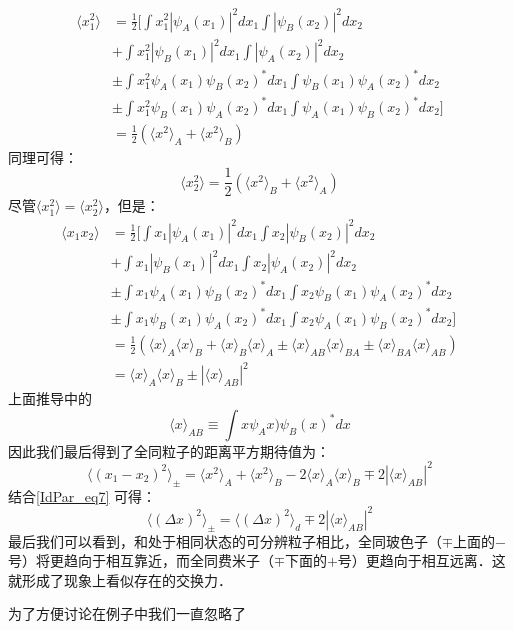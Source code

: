 \begin{itemize}
\begin{align}
\langle x_1^2\rangle &= \frac{1}{2}\big[\int x_1^2|\psi_A(x_1)|^2dx_1\int |\psi_B(x_2)|^2dx_2\\
&+\int x_1^2|\psi_B(x_1)|^2dx_1\int |\psi_A(x_2)|^2dx_2\\ 
&\pm\int x_1^2\psi_A(x_1)\psi_B(x_2)^*dx_1\int \psi_B(x_1)\psi_A(x_2)^*dx_2\\
&\pm\int x_1^2\psi_B(x_1)\psi_A(x_2)^*dx_1\int \psi_A(x_1)\psi_B(x_2)^*dx_2\big]\\
&=\frac{1}{2}(\langle x^2\rangle_A+\langle x^2\rangle_B)
\end{align}
同理可得：
\begin{equation}
\langle x_2^2\rangle=\frac{1}{2}(\langle x^2\rangle_B+\langle x^2\rangle_A)
\end{equation}
尽管$\langle x_1^2\rangle=\langle x_2^2\rangle$，但是：
\begin{align}
\langle x_1x_2\rangle &= \frac{1}{2}\big[\int x_1|\psi_A(x_1)|^2dx_1\int x_2 |\psi_B(x_2)|^2dx_2\\
&+\int x_1|\psi_B(x_1)|^2dx_1\int x_2|\psi_A(x_2)|^2dx_2\\ 
&\pm\int x_1\psi_A(x_1)\psi_B(x_2)^*dx_1\int x_2\psi_B(x_1)\psi_A(x_2)^*dx_2\\
&\pm\int x_1\psi_B(x_1)\psi_A(x_2)^*dx_1\int x_2\psi_A(x_1)\psi_B(x_2)^*dx_2\big]\\
&=\frac{1}{2}\left(\langle x\rangle_A\langle x\rangle_B+\langle x\rangle_B\langle x\rangle_A\pm\langle x\rangle_{AB}\langle x\rangle_{BA}\pm\langle x\rangle_{BA}\langle x\rangle_{AB}\right)\\
&=\langle x\rangle_A\langle x\rangle_B\pm|\langle x\rangle_{AB}|^2
\end{align}
上面推导中的\begin{equation}
\langle x\rangle_{AB}\equiv \int x\psi_Ax)\psi_B(x)^*dx
\end{equation}
因此我们最后得到了全同粒子的距离平方期待值为：
\begin{equation}
\langle (x_1-x_2)^2\rangle_\pm=\langle x^2\rangle_A+\langle x^2\rangle_B-2\langle x\rangle_A\langle x\rangle_B\mp 2|\langle x\rangle_{AB}|^2
\end{equation}
结合\autoref{IdPar_eq7} 可得：
\begin{equation}
\langle (\Delta x)^2\rangle_\pm=\langle (\Delta x)^2\rangle_d\mp 2|\langle x\rangle_{AB}|^2
\end{equation}
最后我们可以看到，和处于相同状态的可分辨粒子相比，全同玻色子（$\mp$上面的$-$号）将更趋向于相互靠近，而全同费米子（$\mp$下面的$+$号）更趋向于相互远离．这就形成了现象上看似存在的交换力．
\end{itemize}

为了方便讨论在例子中我们一直忽略了